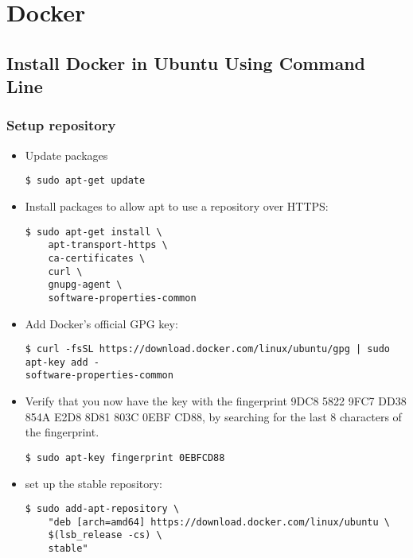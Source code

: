 \chapter{Docker}
  
\section{Install Docker in Ubuntu Using Command Line}	
  	
  
\subsection{Setup repository}
\begin{itemize}
\item Update packages 
	
\begin{verbatim}
$ sudo apt-get update
\end{verbatim}

\item Install packages to allow apt to use a repository over HTTPS:

\begin{verbatim}
$ sudo apt-get install \
	apt-transport-https \
	ca-certificates \
	curl \
	gnupg-agent \
	software-properties-common
\end{verbatim}

\item Add Docker’s official GPG key:
\begin{verbatim}
$ curl -fsSL https://download.docker.com/linux/ubuntu/gpg | sudo apt-key add -
software-properties-common
\end{verbatim}


\item Verify that you now have the key with the fingerprint 9DC8 5822 9FC7 DD38 854A E2D8 8D81 803C 0EBF CD88, by searching for the last 8 characters of the fingerprint.
\begin{verbatim}
$ sudo apt-key fingerprint 0EBFCD88
\end{verbatim}


\item set up the stable repository:
\begin{verbatim}
$ sudo add-apt-repository \
	"deb [arch=amd64] https://download.docker.com/linux/ubuntu \
	$(lsb_release -cs) \
	stable"
\end{verbatim}

\end{itemize}

